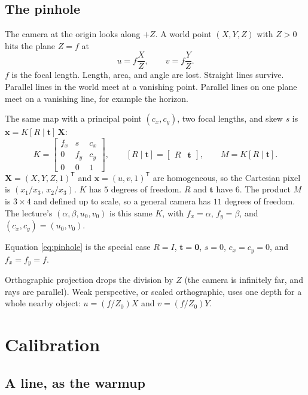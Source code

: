 \documentclass[11pt]{article}
\begin{document}
\subsection{The pinhole}

The camera at the origin looks along $+Z$. A world point $(X,Y,Z)$ with $Z>0$ hits the plane $Z=f$ at
\begin{equation}
u=f\frac{X}{Z},
\qquad
v=f\frac{Y}{Z}.
\label{eq:pinhole}
\end{equation}
$f$ is the focal length. Length, area, and angle are lost. Straight lines survive. Parallel lines in the world meet at a vanishing point. Parallel lines on one plane meet on a vanishing line, for example the horizon.

The same map with a principal point $(c_x,c_y)$, two focal lengths, and skew $s$ is $\mathbf{x}=K[R\mid\mathbf{t}]\,\mathbf{X}$:
\begin{equation}
K=
\begin{bmatrix}
f_x & s & c_x \\
0 & f_y & c_y \\
0 & 0 & 1
\end{bmatrix},
\qquad
[R\mid\mathbf{t}]=
\begin{bmatrix}
R & \mathbf{t}
\end{bmatrix},
\qquad
M=K[R\mid\mathbf{t}].
\label{eq:camera}
\end{equation}
$\mathbf{X}=(X,Y,Z,1)^{\mathsf T}$ and $\mathbf{x}=(u,v,1)^{\mathsf T}$ are homogeneous, so the Cartesian pixel is $(x_1/x_3,\,x_2/x_3)$. $K$ has $5$ degrees of freedom. $R$ and $\mathbf{t}$ have $6$. The product $M$ is $3\times 4$ and defined up to scale, so a general camera has $11$ degrees of freedom. The lecture's $(\alpha,\beta,u_0,v_0)$ is this same $K$, with $f_x=\alpha$, $f_y=\beta$, and $(c_x,c_y)=(u_0,v_0)$.

Equation \eqref{eq:pinhole} is the special case $R=I$, $\mathbf{t}=\mathbf{0}$, $s=0$, $c_x=c_y=0$, and $f_x=f_y=f$.

Orthographic projection drops the division by $Z$ (the camera is infinitely far, and rays are parallel). Weak perspective, or scaled orthographic, uses one depth for a whole nearby object: $u=(f/Z_0)X$ and $v=(f/Z_0)Y$.

\section{Calibration}

\subsection{A line, as the warmup}
\end{document}
